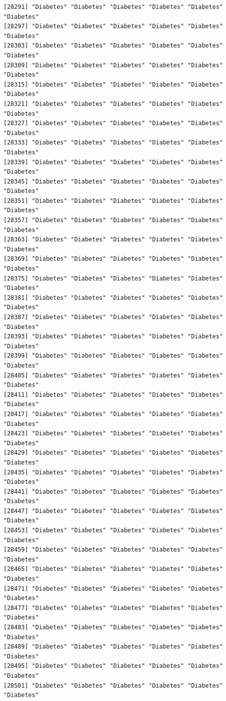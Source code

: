 \documentclass[
  letterpaper,
  DIV=11,
  numbers=noendperiod]{scrartcl}
\begin{document}
\begin{verbatim}
[28291] "Diabetes" "Diabetes" "Diabetes" "Diabetes" "Diabetes" "Diabetes"
[28297] "Diabetes" "Diabetes" "Diabetes" "Diabetes" "Diabetes" "Diabetes"
[28303] "Diabetes" "Diabetes" "Diabetes" "Diabetes" "Diabetes" "Diabetes"
[28309] "Diabetes" "Diabetes" "Diabetes" "Diabetes" "Diabetes" "Diabetes"
[28315] "Diabetes" "Diabetes" "Diabetes" "Diabetes" "Diabetes" "Diabetes"
[28321] "Diabetes" "Diabetes" "Diabetes" "Diabetes" "Diabetes" "Diabetes"
[28327] "Diabetes" "Diabetes" "Diabetes" "Diabetes" "Diabetes" "Diabetes"
[28333] "Diabetes" "Diabetes" "Diabetes" "Diabetes" "Diabetes" "Diabetes"
[28339] "Diabetes" "Diabetes" "Diabetes" "Diabetes" "Diabetes" "Diabetes"
[28345] "Diabetes" "Diabetes" "Diabetes" "Diabetes" "Diabetes" "Diabetes"
[28351] "Diabetes" "Diabetes" "Diabetes" "Diabetes" "Diabetes" "Diabetes"
[28357] "Diabetes" "Diabetes" "Diabetes" "Diabetes" "Diabetes" "Diabetes"
[28363] "Diabetes" "Diabetes" "Diabetes" "Diabetes" "Diabetes" "Diabetes"
[28369] "Diabetes" "Diabetes" "Diabetes" "Diabetes" "Diabetes" "Diabetes"
[28375] "Diabetes" "Diabetes" "Diabetes" "Diabetes" "Diabetes" "Diabetes"
[28381] "Diabetes" "Diabetes" "Diabetes" "Diabetes" "Diabetes" "Diabetes"
[28387] "Diabetes" "Diabetes" "Diabetes" "Diabetes" "Diabetes" "Diabetes"
[28393] "Diabetes" "Diabetes" "Diabetes" "Diabetes" "Diabetes" "Diabetes"
[28399] "Diabetes" "Diabetes" "Diabetes" "Diabetes" "Diabetes" "Diabetes"
[28405] "Diabetes" "Diabetes" "Diabetes" "Diabetes" "Diabetes" "Diabetes"
[28411] "Diabetes" "Diabetes" "Diabetes" "Diabetes" "Diabetes" "Diabetes"
[28417] "Diabetes" "Diabetes" "Diabetes" "Diabetes" "Diabetes" "Diabetes"
[28423] "Diabetes" "Diabetes" "Diabetes" "Diabetes" "Diabetes" "Diabetes"
[28429] "Diabetes" "Diabetes" "Diabetes" "Diabetes" "Diabetes" "Diabetes"
[28435] "Diabetes" "Diabetes" "Diabetes" "Diabetes" "Diabetes" "Diabetes"
[28441] "Diabetes" "Diabetes" "Diabetes" "Diabetes" "Diabetes" "Diabetes"
[28447] "Diabetes" "Diabetes" "Diabetes" "Diabetes" "Diabetes" "Diabetes"
[28453] "Diabetes" "Diabetes" "Diabetes" "Diabetes" "Diabetes" "Diabetes"
[28459] "Diabetes" "Diabetes" "Diabetes" "Diabetes" "Diabetes" "Diabetes"
[28465] "Diabetes" "Diabetes" "Diabetes" "Diabetes" "Diabetes" "Diabetes"
[28471] "Diabetes" "Diabetes" "Diabetes" "Diabetes" "Diabetes" "Diabetes"
[28477] "Diabetes" "Diabetes" "Diabetes" "Diabetes" "Diabetes" "Diabetes"
[28483] "Diabetes" "Diabetes" "Diabetes" "Diabetes" "Diabetes" "Diabetes"
[28489] "Diabetes" "Diabetes" "Diabetes" "Diabetes" "Diabetes" "Diabetes"
[28495] "Diabetes" "Diabetes" "Diabetes" "Diabetes" "Diabetes" "Diabetes"
[28501] "Diabetes" "Diabetes" "Diabetes" "Diabetes" "Diabetes" "Diabetes"

\end{verbatim}
\end{document}
